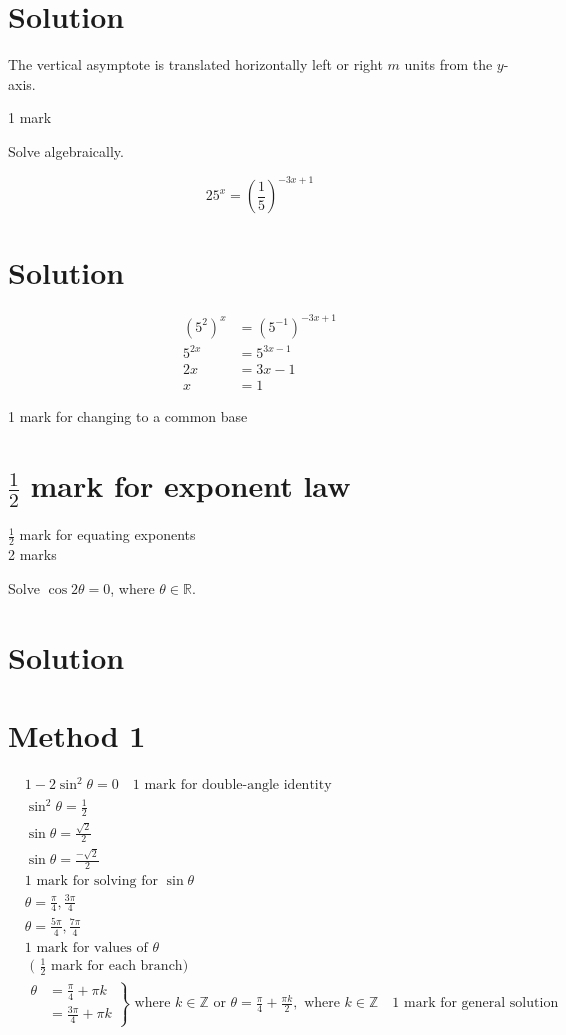 \documentclass[10pt]{article}
\begin{document}
\section*{Solution}
The vertical asymptote is translated horizontally left or right $m$ units from the $y$-axis.

1 mark

Solve algebraically.

$$
25^{x}=\left(\frac{1}{5}\right)^{-3 x+1}
$$

\section*{Solution}
$$
\begin{aligned}
\left(5^{2}\right)^{x} & =\left(5^{-1}\right)^{-3 x+1} \\
5^{2 x} & =5^{3 x-1} \\
2 x & =3 x-1 \\
x & =1
\end{aligned}
$$

1 mark for changing to a common base

\section*{$\frac{1}{2}$ mark for exponent law}
$\frac{1}{2}$ mark for equating exponents\\
2 marks

Solve $\cos 2 \theta=0$, where $\theta \in \mathbb{R}$.

\section*{Solution}
\section*{Method 1}
$$
\begin{aligned}
& 1-2 \sin ^{2} \theta=0 \quad 1 \text { mark for double-angle identity } \\
& \sin ^{2} \theta=\frac{1}{2} \\
& \sin \theta=\frac{\sqrt{2}}{2} \\
& \sin \theta=\frac{-\sqrt{2}}{2} \\
& 1 \text { mark for solving for } \sin \theta \\
& \theta=\frac{\pi}{4}, \frac{3 \pi}{4} \\
& \theta=\frac{5 \pi}{4}, \frac{7 \pi}{4} \\
& 1 \text { mark for values of } \theta \\
& \text { ( } \frac{1}{2} \text { mark for each branch) } \\
& \left.\begin{array}{rl}
\theta & =\frac{\pi}{4}+\pi k \\
& =\frac{3 \pi}{4}+\pi k
\end{array}\right\} \text { where } k \in \mathbb{Z} \text { or } \theta=\frac{\pi}{4}+\frac{\pi k}{2}, \text { where } k \in \mathbb{Z} \quad 1 \text { mark for general solution }
\end{aligned}
$$
\end{document}

